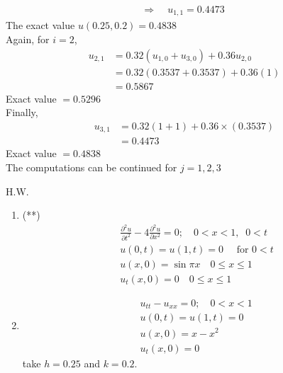\documentclass[../main-sheet.tex]{subfiles}
\begin{document}
\begin{soln}
\begin{align*}
        \Rightarrow\;\;&u_{1,1}=0.4473
    \end{align*}
    The exact value \(u(0.25,0.2)=0.4838\)\\
    Again, for \(i=2\),
    \begin{align*}
        u_{2,1}&=0.32(u_{1,0}+u_{3,0})+0.36u_{2,0}\\
        &=0.32(0.3537+0.3537)+0.36(1)\\
        &=0.5867
    \end{align*}
    Exact value \(= 0.5296\)\\
    Finally, 
    \begin{align*}
        u_{3,1}&=0.32(1+1)+0.36\times(0.3537)\\
        &=0.4473
    \end{align*}
    Exact value \(=0.4838\)\\
    The computations can be continued for \(j=1,2,3\)
\end{soln}
H.W.
\begin{enumerate}
    \item(**) \begin{align*}
        &\frac{\partial^2 u}{\partial t^2}-4\frac{\partial^2 u}{\partial x^2}=0;\quad 0<x<1, \;\;0<t\\
        &u(0,t)=u(1,t)=0 \quad \text{ for } 0<t\\
        &u(x,0)=\sin\pi x \quad 0\leq x\leq 1\\
        &u_t(x,0)=0 \quad 0\leq x\leq 1
    \end{align*}
    \item \begin{align*}
        &u_{tt}-u_{xx}=0;\quad 0<x<1\\
        &u(0,t)=u(1,t)=0 \quad\\
        &u(x,0)=x-x^2 \\
        &u_t(x,0)=0
    \end{align*}
    take \(h=0.25\) and \(k=0.2\).
\end{enumerate}
\end{document}
